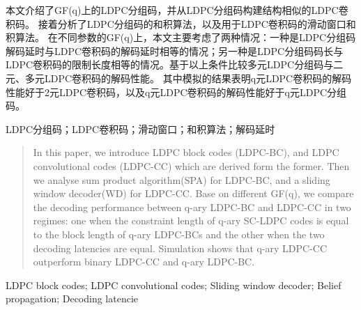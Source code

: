 

\begin{zhaiyao}
本文介绍了GF(q)上的LDPC分组码，并从LDPC分组码构建结构相似的LDPC卷积码。
接着分析了LDPC分组码的和积算法，以及用于LDPC卷积码的滑动窗口和积算法。
在不同参数的GF(q)上，本文主要考虑了两种情况：一种是LDPC分组码解码延时与LDPC卷积码的解码延时相等的情况；另一种是LDPC分组码码长与LDPC卷积码的限制长度相等的情况。基于以上条件比较多元LDPC分组码与二元、多元LDPC卷积码的解码性能。
其中模拟的结果表明q元LDPC卷积码的解码性能好于2元LDPC卷积码，以及q元LDPC卷积码的解码性能好于q元LDPC分组码。
\newline
\end{zhaiyao}


\begin{guanjianci}
LDPC分组码；LDPC卷积码；滑动窗口；和积算法；解码延时
\end{guanjianci}



\begin{abstract}
In this paper, we introduce LDPC block codes (LDPC-BC), and LDPC convolutional codes (LDPC-CC) which are derived form the former. Then we analyse sum product algorithm(SPA) for LDPC-BC, and a sliding window decoder(WD) for LDPC-CC. Base on different GF(q), we compare the decoding performance between q-ary LDPC-BC and LDPC-CC in two regimes: one when the constraint length of q-ary SC-LDPC codes is equal to the block length of q-ary LDPC-BCs and the other when the two decoding latencies are equal. Simulation shows that q-ary LDPC-CC outperform binary LDPC-CC and q-ary LDPC-BC.
\newline
\end{abstract}


\begin{keywords}
LDPC block codes; LDPC convolutional codes; Sliding window decoder; Belief propagation; Decoding latencie
\end{keywords} 